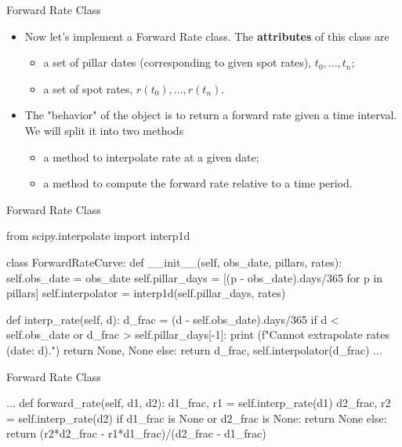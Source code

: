 \documentclass{beamer}
\begin{document}
\begin{frame}{Forward Rate Class}
  \begin{itemize}
  \item Now let's implement a Forward Rate class. The \textbf{attributes} of this class are
      \begin{itemize}
      \item a set of pillar dates (corresponding to given spot rates), $t_0,...,t_{n}$;
      \item a set of spot rates, $r(t_0),...,r(t_{n})$.
      \end{itemize}
  \item The "behavior" of the object is to return a forward rate given a time interval. We will split it into two methods
    \begin{itemize}
    \item a method to interpolate rate at a given date; 
    \item a method to compute the forward rate relative to a time period.
    \end{itemize}
  \end{itemize}
\end{frame}

\begin{frame}[fragile]{Forward Rate Class}
\begin{ipython}
from scipy.interpolate import interp1d

class ForwardRateCurve:
    def __init__(self, obs_date, pillars, rates):
        self.obs_date = obs_date
        self.pillar_days = [(p - obs_date).days/365 for p in pillars]
        self.interpolator = interp1d(self.pillar_days, rates)
    
    def interp_rate(self, d):
        d_frac = (d - self.obs_date).days/365
        if d < self.obs_date or d_frac > self.pillar_days[-1]:
            print (f"Cannot extrapolate rates (date: {d}).")
            return None, None
        else:
            return d_frac, self.interpolator(d_frac)
    ...
\end{ipython}
\end{frame}

\begin{frame}[fragile]{Forward Rate Class}
\begin{ipython}
    ...
    def forward_rate(self, d1, d2):
        d1_frac, r1 = self.interp_rate(d1)
        d2_frac, r2 = self.interp_rate(d2)
        if d1_frac is None or d2_frac is None:
            return None
        else:
            return (r2*d2_frac - r1*d1_frac)/(d2_frac - d1_frac)
\end{ipython}
\end{frame}
\end{document}

